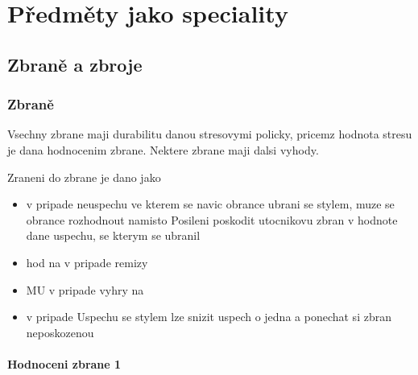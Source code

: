 \chapter{Předměty jako speciality}
\label{chap:magicke-spec-predmety}

\section{Zbraně a zbroje}
\label{sec:zbrane-zbroje}

\subsection{Zbraně}
\label{sec:zbraně}


Vsechny zbrane maji durabilitu danou stresovymi policky, pricemz hodnota stresu je dana hodnocenim zbrane. Nektere zbrane maji dalsi vyhody.

Zraneni do zbrane je dano jako

\begin{itemize}
	\item v pripade neuspechu ve kterem se navic obrance ubrani se stylem, muze se obrance rozhodnout namisto Posileni poskodit utocnikovu zbran v hodnote dane uspechu, se kterym se ubranil
	\item hod na  v pripade remizy
	\item MU v pripade vyhry na 
	\item v pripade Uspechu se stylem lze snizit uspech o jedna a ponechat si zbran neposkozenou 
\end{itemize}

\subsubsection{Hodnoceni zbrane 1}
\label{sec:zbrane_jedna}

